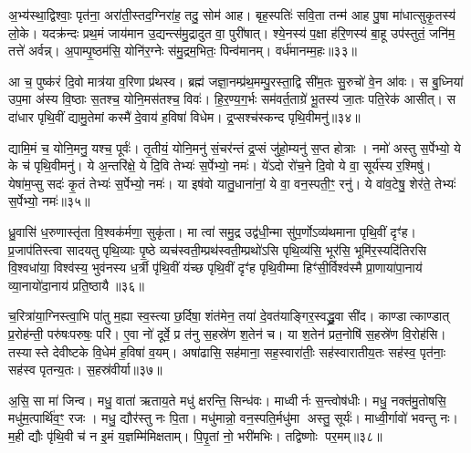 {\anuvakamend[{आ मन्द॑स्व सान॒सिमेका॒न्नच॑त्वारि॒ꣳ॒शच्च॑॥७॥}]}

अ॒भ्य॑स्था॒द्विश्वाः॒ पृत॑ना॒ अरा॑ती॒स्तद॒ग्निरा॑ह॒ तदु॒ सोम॑ आह। बृह॒स्पतिः॑ सवि॒ता तन्म॑ आह पु॒षा मा॑धात्सुकृ॒तस्य॑ लो॒के। यदक्र॑न्दः प्रथ॒मं जाय॑मान उ॒द्यन्त्स॑मु॒द्रादुत वा॒ पुरी॑षात्। श्ये॒नस्य॑ प॒क्षा ह॑रि॒णस्य॑ बा॒हू उप॑स्तुतं॒ जनि॑म॒ तत्ते॑ अर्वन्न्। अ॒पाम्पृ॒ष्ठम॑सि॒ योनि॑र॒ग्नेः स॑मु॒द्रम॒भितः॒ पिन्व॑मानम्। वर्ध॑मानम्म॒हः॥३३॥

आ च॒ पुष्क॑रं दि॒वो मात्र॑या व॒रिणा प्र॑थस्व। ब्रह्म॑ जज्ञा॒नम्प्र॑थ॒मम्पु॒रस्ता॒द्वि सी॑म॒तः सु॒रुचो॑ वे॒न आ॑वः। स बु॒ध्निया॑ उप॒मा अ॑स्य वि॒ष्ठाः स॒तश्च॒ योनि॒मस॑तश्च॒ विवः॑। हि॒र॒ण्य॒ग॒र्भः सम॑वर्त॒ताग्रे॑ भू॒तस्य॑ जा॒तः पति॒रेक॑ आसीत्। स दा॑धार पृथि॒वीं द्यामु॒तेमां कस्मै॑ दे॒वाय॑ ह॒विषा॑ विधेम। द्र॒प्सश्च॑स्कन्द पृथि॒वीमनु॑॥३४॥

द्यामि॒मं च॒ योनि॒मनु॒ यश्च॒ पूर्वः॑। तृ॒तीयं॒ योनि॒मनु॑ सं॒चर॑न्तं द्र॒प्सं जु॑हो॒म्यनु॑ स॒प्त होत्राः। नमो॑ अस्तु स॒र्पेभ्यो॒ ये के च॑ पृथि॒वीमनु॑। ये अ॒न्तरि॑क्षे॒ ये दि॒वि तेभ्यः॑ स॒र्पेभ्यो॒ नमः॑। ये॑ऽदो रो॑च॒ने दि॒वो ये वा॒ सूर्य॑स्य र॒श्मिषु॑। येषा॑म॒प्सु सदः॑ कृ॒तं तेभ्यः॑ स॒र्पेभ्यो॒ नमः॑। या इष॑वो यातु॒धाना॑नां॒ ये वा॒ वन॒स्पती॒ꣳ॒ रनु॑। ये वा॑व॒टेषु॒ शेर॑ते॒ तेभ्यः॑ स॒र्पेभ्यो॒ नमः॑॥३५॥

{\anuvakamend[{म॒होऽनु॑ यातु॒धाना॑ना॒मेका॑दश च॥८॥}]}

ध्रु॒वासि॑ ध॒रुणास्तृ॑ता वि॒श्वक॑र्मणा॒ सुकृ॑ता। मा त्वा॑ समु॒द्र उद्व॑धी॒न्मा सु॑प॒र्णोऽव्य॑थमाना पृथि॒वीं दृꣳ॑ह। प्र॒जाप॑तिस्त्वा सादयतु पृथि॒व्याः पृ॒ष्ठे व्यच॑स्वती॒म्प्रथ॑स्वती॒म्प्रथो॑ऽसि पृथि॒व्य॑सि॒ भूर॑सि॒ भूमि॑र॒स्यदि॑तिरसि वि॒श्वधा॑या॒ विश्व॑स्य॒ भुव॑नस्य ध॒र्त्री पृ॑थि॒वीं य॑च्छ पृथि॒वीं दृꣳ॑ह पृथि॒वीम्मा हिꣳ॑सी॒र्विश्व॑स्मै प्रा॒णाया॑पा॒नाय॑ व्या॒नायो॑दा॒नाय॑ प्रति॒ष्ठायै॥३६॥

च॒रित्रा॑या॒ग्निस्त्वा॒भि पा॑तु म॒ह्या स्व॒स्त्या छ॒र्दिषा॒ शंत॑मेन॒ तया॑ दे॒वत॑याङ्गिर॒स्वद्ध्रु॒वा सी॑द। काण्डात्काण्डात् प्र॒रोह॑न्ती॒ परु॑षःपरुषः॒ परि॑। ए॒वा नो॑ दूर्वे॒ प्र त॑नु स॒हस्रे॑ण श॒तेन॑ च। या श॒तेन॑ प्रत॒नोषि॑ स॒हस्रे॑ण वि॒रोह॑सि। तस्यास्ते देवीष्टके वि॒धेम॑ ह॒विषा॑ व॒यम्। अषा॑ढासि॒ सह॑माना॒ सह॒स्वारा॑तीः॒ सह॑स्वारातीय॒तः सह॑स्व॒ पृत॑नाः॒ सह॑स्व पृतन्य॒तः। स॒हस्र॑वीर्या॥३७॥

अ॒सि॒ सा मा॑ जिन्व। मधु॒ वाता॑ ऋताय॒ते मधु॑ क्षरन्ति॒ सिन्ध॑वः। माध्वीर्नः स॒न्त्वोष॑धीः। मधु॒ नक्त॑मु॒तोषसि॒ मधु॑म॒त्पार्थि॑व॒ꣳ॒ रजः। मधु॒ द्यौर॑स्तु नः पि॒ता। मधु॑मान्नो॒ वन॒स्पति॒र्मधु॑मा अस्तु॒ सूर्यः॑। माध्वी॒र्गावो॑ भवन्तु नः। म॒ही द्यौः पृ॑थि॒वी च॑ न इ॒मं य॒ज्ञम्मि॑मिक्षताम्। पि॒पृ॒तां नो॒ भरी॑मभिः। तद्विष्णोः पर॒मम्॥३८॥

